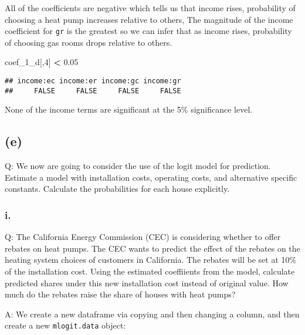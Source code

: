 \documentclass[
]{article}
\newenvironment{Shaded}{\begin{snugshade}}{\end{snugshade}}
\newcommand{\DecValTok}[1]{\textcolor[rgb]{0.00,0.00,0.81}{#1}}
\newcommand{\FloatTok}[1]{\textcolor[rgb]{0.00,0.00,0.81}{#1}}
\newcommand{\NormalTok}[1]{#1}
\newcommand{\OperatorTok}[1]{\textcolor[rgb]{0.81,0.36,0.00}{\textbf{#1}}}
\newcommand{\StringTok}[1]{\textcolor[rgb]{0.31,0.60,0.02}{#1}}
\begin{document}
All of the coefficients are negative which tells us that income rises,
probability of choosing a heat pump increases relative to others, The
magnitude of the income coefficient for \texttt{gr} is the greatest so
we can infer that as income rises, probability of choosing gas rooms
drops relative to others.

\begin{Shaded}
\begin{Highlighting}[]
\NormalTok{coef_}\DecValTok{1}\NormalTok{_d[,}\DecValTok{4}\NormalTok{] }\OperatorTok{<}\StringTok{ }\FloatTok{0.05}
\end{Highlighting}
\end{Shaded}

\begin{verbatim}
## income:ec income:er income:gc income:gr 
##     FALSE     FALSE     FALSE     FALSE
\end{verbatim}

None of the income terms are significant at the 5\% significance level.

\hypertarget{e}{%
\subsection{(e)}\label{e}}

Q: We now are going to consider the use of the logit model for
prediction. Estimate a model with installation costs, operating costs,
and alternative specific constants. Calculate the probabilities for each
house explicitly.

\hypertarget{i.-3}{%
\subsubsection{i.}\label{i.-3}}

Q: The California Energy Commission (CEC) is considering whether to
offer rebates on heat pumps. The CEC wants to predict the effect of the
rebates on the heating system choices of customers in California. The
rebates will be set at 10\% of the installation cost. Using the
estimated coeffiients from the model, calculate predicted shares under
this new installation cost instead of original value. How much do the
rebates raise the share of houses with heat pumps?

A: We create a new dataframe via copying and then changing a column, and
then create a new \texttt{mlogit.data} object:
\end{document}
